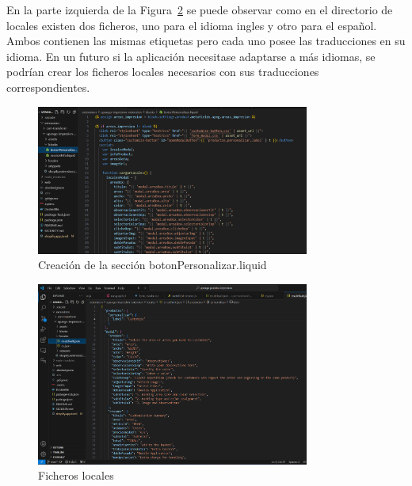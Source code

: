 \documentclass[12pt]{article}
\begin{document}
En la parte izquierda de la Figura~\ref{fig:locales} se puede observar como en el directorio de locales existen dos ficheros, uno para el idioma ingles y otro para el español. 
Ambos contienen las mismas etiquetas pero cada uno posee las traducciones en su idioma. En un futuro si la aplicación necesitase adaptarse a más idiomas, se podrían crear los ficheros locales
necesarios con sus traducciones correspondientes.


\begin{figure}[ht]
    \centering
    \includegraphics[width=0.8\textwidth]{imagenesUS1/seccionPersonalizarBoton.png}
    \caption{\label{fig:creacionSeccion}Creación de la sección botonPersonalizar.liquid}
    \vspace{\fill}
\end{figure}

\begin{figure}[ht]
    \centering
    \includegraphics[width=0.8\textwidth]{imagenesUS1/locales.png}
    \caption{\label{fig:locales}Ficheros locales}
    \vspace{\fill}
\end{figure}
\end{document}
